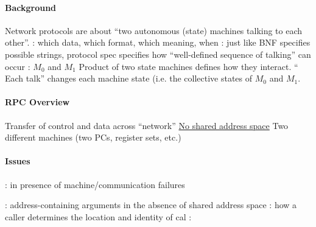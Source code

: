 \documentclass{memo}
\begin{document}
\small
{}

\paragraph{Background}
\bit
\w Network protocols are about ``two autonomous 
       (state) machines talking to each other''.
  \bit
  \w {}: which data, which format, which meaning, when
  \w {}: just like BNF specifies possible strings, 
     protocol spec specifies how ``well-defined sequence of talking'' can
     occur  
  \eit
\w {}: $M_0$ and $M_1$
   \bit
   \w Product of two state machines defines how they interact.
   \w `` Each talk'' changes each machine state (i.e. the collective 
      states of $M_0$ and $M_1$. 
   \eit
\eit

\paragraph{RPC Overview}
\bit
\w Transfer of control and data across ``network''
  \bit
  \w \underline{No shared address space}
  \w Two different machines (two PCs, register sets, etc.)
  \eit
\eit

\paragraph{Issues}
\bit
\w {}: in presence of machine/communication failures

\w {}: {address-containing arguments in the absence of shared address space}  
\w {}:  how a caller determines the location and identity of cal\w
{}
\w {}:
\eit
\end{document}
